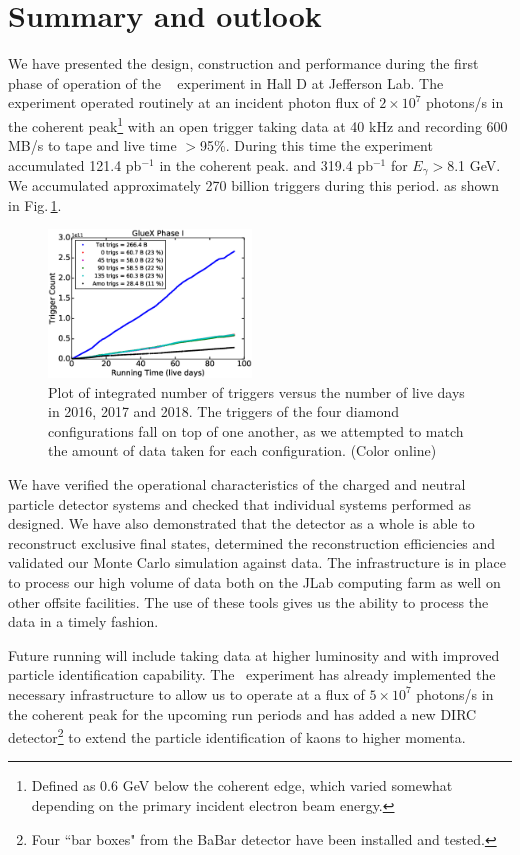 
\section{Summary and outlook\label{sec:summary} }
We have presented the design, construction and performance during the first phase of operation of the  \gx~ experiment in Hall D at Jefferson Lab. 
The experiment operated routinely at an incident photon flux of $2\times 10^{7}$ photons/s in the coherent peak\footnote{Defined as 0.6 GeV below the coherent edge, which varied somewhat depending on the primary incident electron beam energy.} with an open trigger taking data
at 40 kHz and recording 600 MB/s to tape and live time $>$95\%. 
During this time the experiment accumulated  121.4 pb$^{-1}$ in the coherent peak. and 319.4 pb$^{-1}$ for $E_\gamma>$8.1 GeV. We accumulated approximately 270 billion triggers during this period. as shown in Fig.\,\ref{fig:plot_rcdb3_phaseI}.  

\begin{figure}[tbh]\centering
\includegraphics[width=0.48\textwidth]{figures/plot_rcdb3_phaseI.eps}
\caption{\label{fig:plot_rcdb3_phaseI} 
Plot of integrated number of triggers versus the number of live days
in 2016, 2017 and 2018. The triggers of the four diamond configurations fall on top of one another, as we attempted to match the amount of data taken for each configuration. 
(Color online)
 }
\end{figure}   

We have verified the operational characteristics of the charged and neutral particle detector systems and checked that individual systems performed as designed. We have also demonstrated that the detector as a whole is able to reconstruct exclusive final states, determined the reconstruction efficiencies and validated our Monte Carlo simulation against data. The infrastructure is in place to process our high volume of data both on the JLab computing farm as well on other offsite facilities. The use of these tools gives us the ability to process the data in a timely fashion.

Future running will include taking data at higher luminosity  and with improved particle identification capability. 
The \gx~experiment has already implemented the necessary infrastructure to allow us to operate at a flux of $5\times10^{7}$ photons/s in the coherent peak for the upcoming run periods and has added a new DIRC detector\footnote{Four ``bar boxes" from the BaBar \cite{Aubert:2001tu} detector have been installed and tested.} to extend the particle identification of kaons to higher momenta. 

